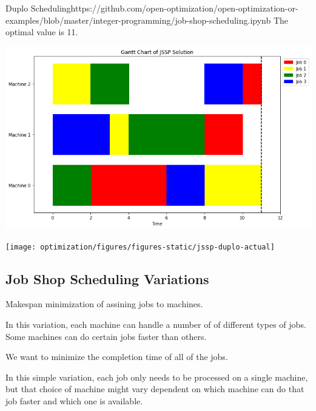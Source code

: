 {\begin{examplewithcode}{Duplo Scheduling}{https://github.com/open-optimization/open-optimization-or-examples/blob/master/integer-programming/job-shop-scheduling.ipynb}
The optimal value is 11.

\includegraphics[scale = 0.5]{optimization/figures/figures-static/jssp-duplo}

\texttt{[image: optimization/figures/figures-static/jssp-duplo-actual]}

\end{examplewithcode}

\subsection{Job Shop Scheduling Variations}

Makespan minimization of assining jobs to machines.

In this variation, each machine can handle a number of of different types of jobs.  Some machines can do certain jobs faster than others. 

We want to minimize the completion time of all of the jobs.  

In this simple variation, each job only needs to be processed on a single machine, but that choice of machine might vary dependent on which machine can do that job faster and which one is available.


}
